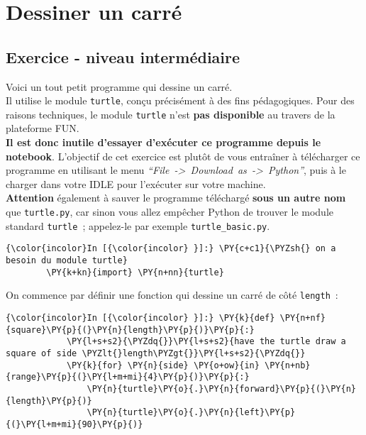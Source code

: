     \hypertarget{dessiner-un-carruxe9}{%
\section{Dessiner un carré}\label{dessiner-un-carruxe9}}

    \hypertarget{exercice---niveau-intermuxe9diaire}{%
\subsection{Exercice - niveau
intermédiaire}\label{exercice---niveau-intermuxe9diaire}}

    Voici un tout petit programme qui dessine un carré.\\

    Il utilise le module \texttt{turtle}, conçu précisément à des fins
pédagogiques. Pour des raisons techniques, le module \texttt{turtle}
n'est \textbf{pas disponible} au travers de la plateforme FUN.\\

    \textbf{Il est donc inutile d'essayer d'exécuter ce programme depuis le
notebook}. L'objectif de cet exercice est plutôt de vous entraîner à
télécharger ce programme en utilisant le menu
\emph{``File~-\textgreater{}~Download~as~-\textgreater{}~Python''}, puis
à le charger dans votre IDLE pour l'exécuter sur votre machine.\\

    \textbf{Attention} également à sauver le programme téléchargé
\textbf{sous un autre nom} que \texttt{turtle.py}, car sinon vous allez
empêcher Python de trouver le module standard \texttt{turtle}~;
appelez-le par exemple \texttt{turtle\_basic.py}.

    \begin{Verbatim}[commandchars=\\\{\}]
{\color{incolor}In [{\color{incolor} }]:} \PY{c+c1}{\PYZsh{} on a besoin du module turtle}
        \PY{k+kn}{import} \PY{n+nn}{turtle}
\end{Verbatim}


    On commence par définir une fonction qui dessine un carré de côté
\texttt{length}~:

    \begin{Verbatim}[commandchars=\\\{\}]
{\color{incolor}In [{\color{incolor} }]:} \PY{k}{def} \PY{n+nf}{square}\PY{p}{(}\PY{n}{length}\PY{p}{)}\PY{p}{:}
            \PY{l+s+s2}{\PYZdq{}}\PY{l+s+s2}{have the turtle draw a square of side \PYZlt{}length\PYZgt{}}\PY{l+s+s2}{\PYZdq{}}
            \PY{k}{for} \PY{n}{side} \PY{o+ow}{in} \PY{n+nb}{range}\PY{p}{(}\PY{l+m+mi}{4}\PY{p}{)}\PY{p}{:}
                \PY{n}{turtle}\PY{o}{.}\PY{n}{forward}\PY{p}{(}\PY{n}{length}\PY{p}{)}
                \PY{n}{turtle}\PY{o}{.}\PY{n}{left}\PY{p}{(}\PY{l+m+mi}{90}\PY{p}{)}
\end{Verbatim}


